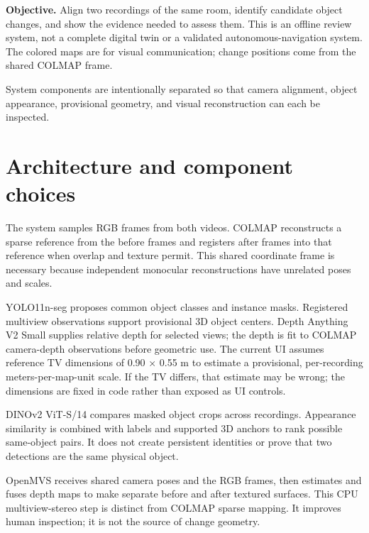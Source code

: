 \documentclass[11pt,a4paper]{article}
\begin{document}
\textbf{Objective.} Align two recordings of the same room, identify candidate object changes, and show the evidence needed to assess them. This is an offline review system, not a complete digital twin or a validated autonomous-navigation system. The colored maps are for visual communication; change positions come from the shared COLMAP frame.

\vfill
{\small\color{muted}System components are intentionally separated so that camera alignment, object appearance, provisional geometry, and visual reconstruction can each be inspected.}
\newpage

\section*{Architecture and component choices}

The system samples RGB frames from both videos. COLMAP reconstructs a sparse reference from the before frames and registers after frames into that reference when overlap and texture permit. This shared coordinate frame is necessary because independent monocular reconstructions have unrelated poses and scales.

YOLO11n-seg proposes common object classes and instance masks. Registered multiview observations support provisional 3D object centers. Depth Anything V2 Small supplies relative depth for selected views; the depth is fit to COLMAP camera-depth observations before geometric use. The current UI assumes reference TV dimensions of 0.90 × 0.55 m to estimate a provisional, per-recording meters-per-map-unit scale. If the TV differs, that estimate may be wrong; the dimensions are fixed in code rather than exposed as UI controls.

DINOv2 ViT-S/14 compares masked object crops across recordings. Appearance similarity is combined with labels and supported 3D anchors to rank possible same-object pairs. It does not create persistent identities or prove that two detections are the same physical object.

OpenMVS receives shared camera poses and the RGB frames, then estimates and fuses depth maps to make separate before and after textured surfaces. This CPU multiview-stereo step is distinct from COLMAP sparse mapping. It improves human inspection; it is not the source of change geometry.
\end{document}
